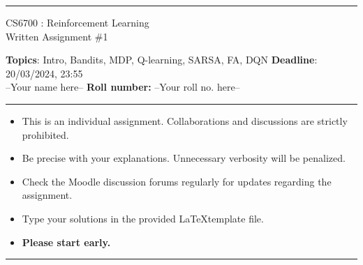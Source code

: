 \documentclass[addpoints,12pt,solution]{exam}
\begin{document}
\hrule
\vspace{1mm}
\noindent 
\begin{center}
{\Large CS6700 : Reinforcement Learning} \\
{\large Written Assignment \#1}
\end{center}
\vspace{1mm}
\noindent 
{\textbf{Topics}: Intro, Bandits, MDP, Q-learning, SARSA, FA, DQN \hfill \textbf{Deadline}: 20/03/2024, 23:55}\\


--Your name here--  \hfill {\bf Roll number: }--Your roll no. here-- 
\vspace{2mm}
\hrule

{\small

\begin{itemize}\itemsep0mm
\item This is an individual assignment. Collaborations and discussions are strictly
prohibited.
\item Be precise with your explanations. Unnecessary verbosity will be penalized.
\item Check the Moodle discussion forums regularly for updates regarding the assignment.
\item Type your solutions in the provided \LaTeX template file.
\item \textbf{Please start early.}
\end{itemize}
}

\hrule

\vspace{3mm}




\end{document}
